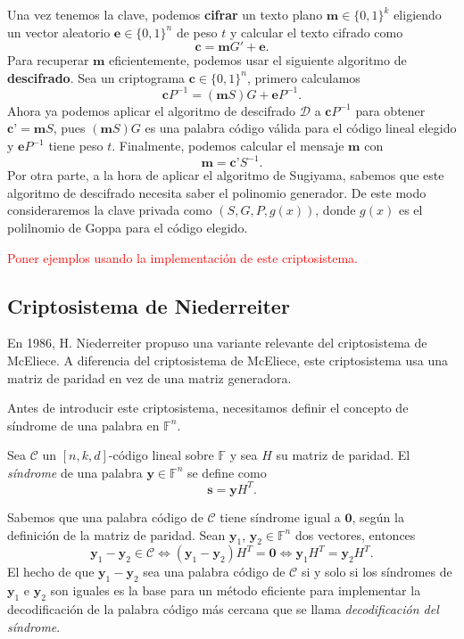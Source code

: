 Una vez tenemos la clave, podemos \textbf{cifrar} un texto plano $\textbf{m} \in \{ 0, 1 \}^k$ eligiendo un vector aleatorio $\textbf{e} \in \{ 0, 1 \}^n$ de peso $t$ y calcular el texto cifrado como
\[
    \textbf{c} = \textbf{m} G' + \textbf{e}.
\]
Para recuperar $\textbf{m}$ eficientemente, podemos usar el siguiente algoritmo de \textbf{descifrado}. Sea un criptograma $\textbf{c} \in \{ 0, 1 \}^n$, primero calculamos
\[
    \textbf{c} P^{-1} = (\textbf{m} S) G + \textbf{e} P^{-1}.
\]
Ahora ya podemos aplicar el algoritmo de descifrado $\mathcal{D}$ a $\textbf{c} P^{-1}$ para obtener $\textbf{c'} = \textbf{m} S$, pues $(\textbf{m} S) G$ es una palabra código válida para el código lineal elegido y $\textbf{e} P^{-1}$ tiene peso $t$. Finalmente, podemos calcular el mensaje $\textbf{m}$ con
\[
    \textbf{m} = \textbf{c'} S^{-1}.
\]
Por otra parte, a la hora de aplicar el algoritmo de Sugiyama, sabemos que este algoritmo de descifrado necesita saber el polinomio generador. De este modo consideraremos la clave privada como $(S, G, P, g(x))$, donde $g(x)$ es el polilnomio de Goppa para el código elegido.

\textcolor{red}{Poner ejemplos usando la implementación de este criptosistema.}


\subsection{Criptosistema de Niederreiter}

En 1986, H. Niederreiter \cite{Niederreiter_1986} propuso una variante relevante del criptosistema de McEliece. A diferencia del criptosistema de McEliece, este criptosistema usa una matriz de paridad en vez de una matriz generadora.

Antes de introducir este criptosistema, necesitamos definir el concepto de síndrome de una palabra en $\mathbb{F}^n$.

\begin{definition}
    Sea $\mathcal{C}$ un $[n, k, d]$-código lineal sobre $\mathbb{F}$ y sea $H$ su matriz de paridad. El \emph{síndrome} de una palabra $\textbf{y} \in \mathbb{F}^n$ se define como
    \[
        \textbf{s} = \textbf{y} H^T.
    \]
\end{definition}

Sabemos que una palabra código de $\mathcal{C}$ tiene síndrome igual a $\textbf{0}$, según la definición de la matriz de paridad. Sean $\textbf{y}_1$, $\textbf{y}_2 \in \mathbb{F}^n$ dos vectores, entonces
\[
    \textbf{y}_1 - \textbf{y}_2 \in \mathcal{C} \Leftrightarrow (\textbf{y}_1 - \textbf{y}_2) H^T = \textbf{0} \Leftrightarrow \textbf{y}_1 H^T = \textbf{y}_2 H^T.
\]
El hecho de que $\textbf{y}_1 - \textbf{y}_2$ sea una palabra código de $\mathcal{C}$ si y solo si los síndromes de $\textbf{y}_1$ e $\textbf{y}_2$ son iguales es la base para un método eficiente para implementar la decodificación de la palabra código más cercana que se llama \emph{decodificación del síndrome}.

